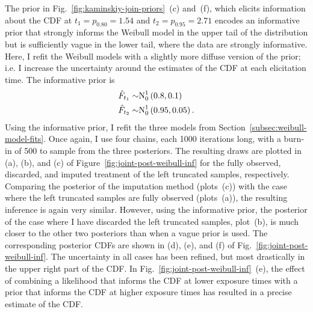The prior in Fig.~\ref{fig:kaminskiy-join-priors}~(c) and~(f), which elicits information about the CDF at $t_1 = p_{0.80} = 1.54$ and $t_2 = p_{0.95} = 2.71$ encodes an informative prior that strongly informs the Weibull model in the upper tail of the distribution but is sufficiently vague in the lower tail, where the data are strongly informative. Here, I refit the Weibull models with a slightly more diffuse version of the prior; i.e. I increase the uncertainty around the estimates of the CDF at each elicitation time. The informative prior is
\begin{align*}
    \hat{F}_{t_1} \sim & \hbox{N}^{1}_{0}\left(0.8, 0.1\right)    \\
    \hat{F}_{t_2} \sim & \hbox{N}^{1}_{0}\left(0.95, 0.05\right).
\end{align*}
Using the informative prior, I refit the three models from Section~\ref{subsec:weibull-model-fits}. Once again, I use four chains, each 1000 iterations long, with a burn-in of 500 to sample from the three posteriors. The resulting draws are plotted in (a), (b), and (c) of Figure~\ref{fig:joint-post-weibull-inf} for the fully observed, discarded, and imputed treatment of the left truncated samples, respectively. Comparing the posterior of the imputation method (plots~(c)) with the case where the left truncated samples are fully observed (plots~(a)), the resulting inference is again very similar. However, using the informative prior, the posterior of the case where I have discarded the left truncated samples, plot~(b), is much closer to the other two posteriors than when a vague prior is used. The corresponding posterior CDFs are shown in (d), (e), and (f) of Fig.~\ref{fig:joint-post-weibull-inf}. The uncertainty in all cases has been refined, but most drastically in the upper right part of the CDF. In Fig.~\ref{fig:joint-post-weibull-inf}~(e), the effect of combining a likelihood that informs the CDF at lower exposure times with a prior that informs the CDF at higher exposure times has resulted in a precise estimate of the CDF. 

